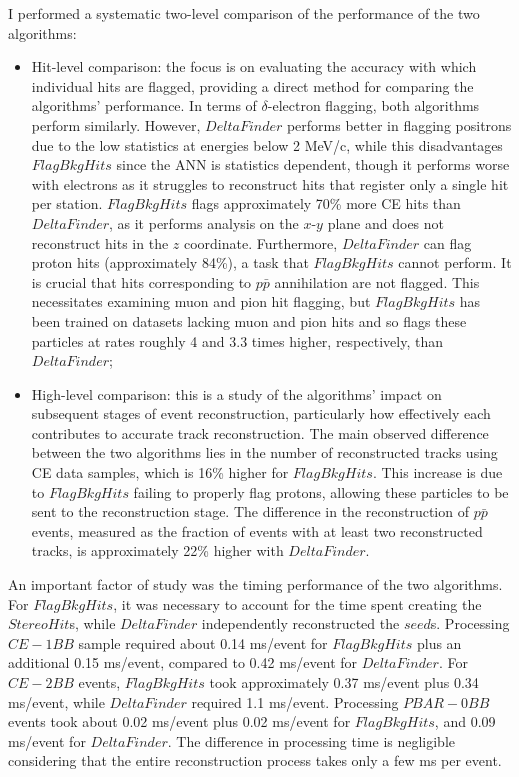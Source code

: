I performed a systematic two-level comparison of the performance of the two algorithms:

\begin{itemize}
    \item Hit-level comparison: the focus is on evaluating the 
    accuracy with which individual hits are flagged, providing a 
    direct method for comparing the algorithms' performance. In terms 
    of $\delta$-electron flagging, both algorithms perform similarly. 
    However, $DeltaFinder$ performs better in flagging positrons 
    due to the low statistics at energies below 2 MeV/c, 
    while this disadvantages $FlagBkgHits$ since the ANN is 
    statistics dependent, though it 
    performs worse with electrons as it struggles to reconstruct hits 
    that register only a single hit per station.  
    $FlagBkgHits$ flags approximately 70\% more CE hits than 
    $DeltaFinder$, as it performs analysis on the $x$-$y$ plane and does 
    not reconstruct hits in the $z$ coordinate. Furthermore, 
    $DeltaFinder$ can flag proton hits (approximately 84\%), 
    a task that $FlagBkgHits$ cannot perform. It is crucial that hits 
    corresponding to $p\bar{p}$ annihilation are not flagged. This necessitates 
    examining muon and pion hit flagging, but $FlagBkgHits$ has been trained 
    on datasets lacking muon and pion hits and so 
    flags these particles at rates roughly 4 and 3.3 times higher, 
    respectively, than $DeltaFinder$;
    
    \item High-level comparison: this is a study of the algorithms' 
    impact on subsequent stages of event reconstruction, particularly 
    how effectively each contributes to accurate track reconstruction. 
    The main observed difference between the two algorithms lies in the number 
    of reconstructed tracks using CE data samples, which is 16\% higher 
    for $FlagBkgHits$. This increase is due to $FlagBkgHits$ failing to 
    properly flag protons, allowing these particles to be sent to the 
    reconstruction stage. The difference in the reconstruction of 
    $p\bar{p}$ events, measured as the fraction of events with 
    at least two reconstructed tracks, is approximately 22\% higher with $DeltaFinder$.
\end{itemize}
An important factor of study was the timing performance of the 
two algorithms. For $FlagBkgHits$, it was necessary to account for the time 
spent creating the $StereoHit$s, while $DeltaFinder$ independently 
reconstructed the $seed$s. Processing $CE-1BB$ sample required about 
0.14 ms/event for $FlagBkgHits$ plus an additional 0.15 ms/event, 
compared to 0.42 ms/event for $DeltaFinder$. For $CE-2BB$ events, 
$FlagBkgHits$ took approximately 0.37 ms/event plus 0.34 ms/event, 
while $DeltaFinder$ required 1.1 ms/event. Processing $PBAR-0BB$ 
events took about 0.02 ms/event plus 0.02 ms/event for $FlagBkgHits$, 
and 0.09 ms/event for $DeltaFinder$. The difference in processing time 
is negligible considering that the entire reconstruction process 
takes only a few ms per event.

